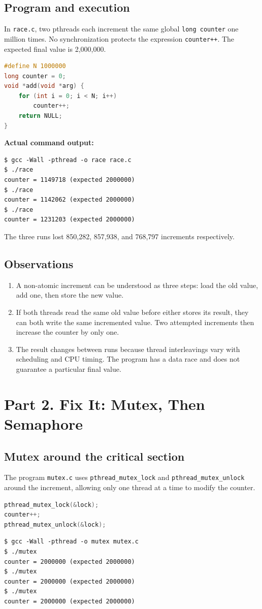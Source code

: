 \documentclass[12pt,a4paper]{article}
\begin{document}
\subsection{Program and execution}
In \texttt{race.c}, two pthreads each increment the same global \texttt{long counter} one million times. No synchronization protects the expression \texttt{counter++}. The expected final value is 2,000,000.
\begin{lstlisting}[language=C]
#define N 1000000
long counter = 0;
void *add(void *arg) {
    for (int i = 0; i < N; i++)
        counter++;
    return NULL;
}
\end{lstlisting}
\noindent\textbf{Actual command output:}
\begin{lstlisting}
$ gcc -Wall -pthread -o race race.c
$ ./race
counter = 1149718 (expected 2000000)
$ ./race
counter = 1142062 (expected 2000000)
$ ./race
counter = 1231203 (expected 2000000)
\end{lstlisting}
The three runs lost 850,282, 857,938, and 768,797 increments respectively.
\subsection{Observations}
\begin{enumerate}[label=\arabic*.]
\item A non-atomic increment can be understood as three steps: load the old value, add one, then store the new value.
\item If both threads read the same old value before either stores its result, they can both write the same incremented value. Two attempted increments then increase the counter by only one.
\item The result changes between runs because thread interleavings vary with scheduling and CPU timing. The program has a data race and does not guarantee a particular final value.
\end{enumerate}

\section{Part 2. Fix It: Mutex, Then Semaphore}
\subsection{Mutex around the critical section}
The program \texttt{mutex.c} uses \texttt{pthread\_mutex\_lock} and \texttt{pthread\_mutex\_unlock} around the increment, allowing only one thread at a time to modify the counter.
\begin{lstlisting}[language=C]
pthread_mutex_lock(&lock);
counter++;
pthread_mutex_unlock(&lock);
\end{lstlisting}
\begin{lstlisting}
$ gcc -Wall -pthread -o mutex mutex.c
$ ./mutex
counter = 2000000 (expected 2000000)
$ ./mutex
counter = 2000000 (expected 2000000)
$ ./mutex
counter = 2000000 (expected 2000000)
\end{lstlisting}
\end{document}
